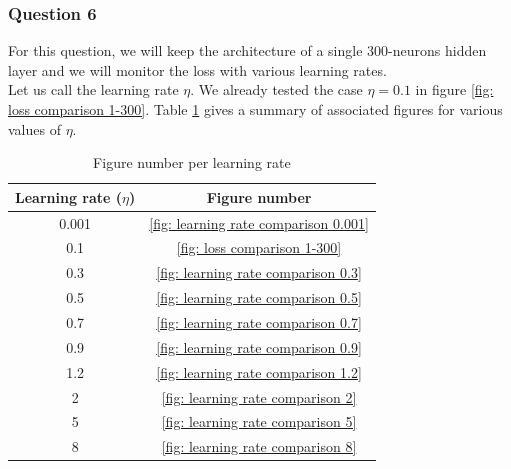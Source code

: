 \documentclass[12pt]{article}
\begin{document}
\subsubsection{Question 6}
For this question, we will keep the architecture of a single 300-neurons hidden layer and we will monitor the loss with various learning rates. \\
Let us call the learning rate $\eta$. We already tested the case $\eta = 0.1$ in figure \ref{fig: loss comparison 1-300}.
Table \ref{table: figures per learning rate} gives a summary of associated figures for various values of $\eta$.
\begin{table}[h]
  \centering
  \begin{tabular}{c|c}
    Learning rate ($\eta$) & Figure number                             \\ \hline
    0.001                  & \ref{fig: learning rate comparison 0.001} \\
    0.1                    & \ref{fig: loss comparison 1-300}          \\
    0.3                    & \ref{fig: learning rate comparison 0.3}   \\
    0.5                    & \ref{fig: learning rate comparison 0.5}   \\
    0.7                    & \ref{fig: learning rate comparison 0.7}   \\
    0.9                    & \ref{fig: learning rate comparison 0.9}   \\
    1.2                    & \ref{fig: learning rate comparison 1.2}   \\
    2                      & \ref{fig: learning rate comparison 2}     \\
    5                      & \ref{fig: learning rate comparison 5}     \\
    8                      & \ref{fig: learning rate comparison 8}     \\
  \end{tabular}
  \caption{Figure number per learning rate}
  \label{table: figures per learning rate}
\end{table}
\end{document}
